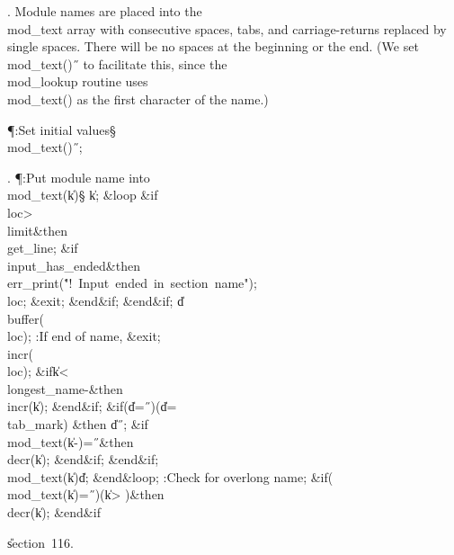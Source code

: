 . Module names are placed into the \\{mod\_text} array with consecutive
spaces,
tabs, and carriage-returns replaced by single spaces. There will be no
spaces at the beginning or the end. (We set \\{mod\_text}\?(\?)\K\?\H{\ } to
facilitate
this, since the \\{mod\_lookup} routine uses \\{mod\_text}\?(\?)\? as the
first
character of the name.)

\Y\P\?\4:Set initial values\X\mathrel{+}\S\?\6
\\{mod\_text}\?\1(\?\2)\K\?\H{\ };\par
\fi

. \P\?:Put module name into \\{mod\_text}\?(\?\to\?\|k\?)\?\X\S\?\6
\|k\?\K{};\6
\1\&{loop}\6
\&{if}\1\1\8\\{loc}\?>\?\\{limit}\2\8\&{then}\6
\\{get\_line};\6
\&{if}\1\1\8\\{input\_has\_ended}\2\8\&{then}\6
\\{err\_print}\?\1(\?\.{"!\ Input\ ended\ in\ section\ name"}\?\2)\?;\6
\\{loc}\?\K{};\6
\&{exit};\2\6
\&{end}\8\2\&{if}\1;\2\6
\&{end}\8\2\&{if}\1;\6
\|d\?\K\?\\{buffer}\?\1(\?\\{loc}\?\2)\?;\5
:If end of name, \&{exit}\X;\6
\\{incr}\?\1(\?\\{loc}\?\2)\?;\6
\&{if}\1\1\8\|k\?<\?\\{longest\_name}\?-\2\8\&{then}\6
\\{incr}\?\1(\?\|k\?\2)\?;\2\6
\&{end}\8\2\&{if}\1;\6
\&{if}\1\1\?\8\1(\?\|d\?=\?\H{\ }\?\2)\V\1(\?\|d\?=\?\\{tab\_mark}\?\2)\?\2\8%
\&{then}\6
\|d\?\K\?\H{\ };\6
\&{if}\1\1\8\\{mod\_text}\?\1(\?\|k\?-\?\2)=\?\H{\ }\2\8\&{then}\6
\\{decr}\?\1(\?\|k\?\2)\?;\2\6
\&{end}\8\2\&{if}\1;\2\6
\&{end}\8\2\&{if}\1;\6
\\{mod\_text}\?\1(\?\|k\?\2)\K\?\|d;\2\6
\&{end}\8\&{loop};\6
:Check for overlong name\X;\6
\&{if}\1\1\?\8\1(\?\\{mod\_text}\?\1(\?\|k\?\2)=\?\H{\ }\?\2)\W\1(\?\|k\?>\?%
\2)\?\2\8\&{then}\6
\\{decr}\?\1(\?\|k\?\2)\?;\2\6
\&{end}\8\2\&{if}\1\par
\U section~116.\fi

